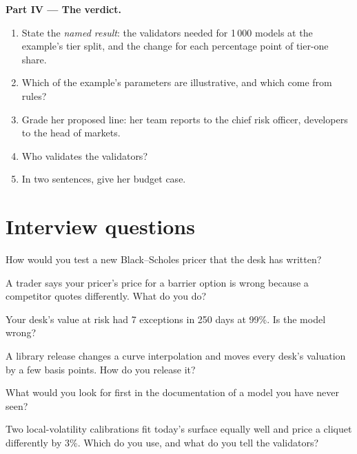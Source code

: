 \begin{problem}
\medskip\noindent\textbf{Part IV --- The verdict.}
\begin{enumerate}[resume]
\item State the \emph{named result}: the validators needed for 1\,000 models at the example's tier split, and the change
for each percentage point of tier-one share.
\item Which of the example's parameters are illustrative, and which come from rules?
\item Grade her proposed line: her team reports to the chief risk officer, developers to the head of markets.
\item Who validates the validators?
\item In two sentences, give her budget case.
\end{enumerate}
\end{problem}

\section{Interview questions}

\begin{interviewq}\label{iq:in:bank-quant:1}
How would you test a new Black--Scholes pricer that the desk has written?
\end{interviewq}

\begin{interviewq}\label{iq:in:bank-quant:2}
A trader says your pricer's price for a barrier option is wrong because a competitor quotes differently. What do you do?
\end{interviewq}

\begin{interviewq}\label{iq:in:bank-quant:3}
Your desk's value at risk had 7 exceptions in 250 days at 99\%. Is the model wrong?
\end{interviewq}

\begin{interviewq}\label{iq:in:bank-quant:4}
A library release changes a curve interpolation and moves every desk's valuation by a few basis points. How do you release
it?
\end{interviewq}

\begin{interviewq}\label{iq:in:bank-quant:5}
What would you look for first in the documentation of a model you have never seen?
\end{interviewq}

\begin{interviewq}\label{iq:in:bank-quant:6}
Two local-volatility calibrations fit today's surface equally well and price a cliquet differently by 3\%. Which do you
use, and what do you tell the validators?
\end{interviewq}

